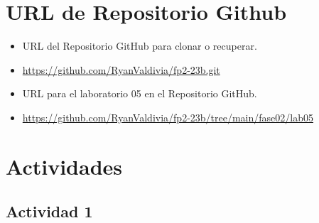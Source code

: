 \documentclass{article}
\begin{document}
	\section{URL de Repositorio Github}
	\begin{itemize}
		\item URL del Repositorio GitHub para clonar o recuperar.
		\item \url{https://github.com/RyanValdivia/fp2-23b.git}
		\item URL para el laboratorio 05 en el Repositorio GitHub.
		\item \url{https://github.com/RyanValdivia/fp2-23b/tree/main/fase02/lab05}
	\end{itemize}
	
	\section{Actividades}
	\subsection{Actividad 1}
	
\end{document}
